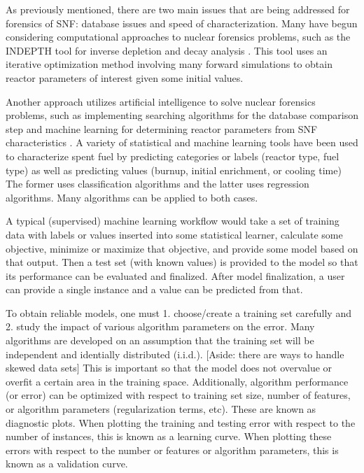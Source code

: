 As previously mentioned, there are two main issues that are being addressed for
forensics of \gls{SNF}: database issues and speed of characterization. Many
have begun considering computational approaches to nuclear forensics problems,
such as the INDEPTH tool for inverse depletion and decay analysis
\cite{weber_2006, weber_2010, weber_2011}. This tool uses an iterative
optimization method involving many forward simulations to obtain reactor
parameters of interest given some initial values. 

Another approach utilizes artificial intelligence to solve nuclear forensics
problems, such as implementing searching algorithms for the database comparison
step \cite{gey_search} and machine learning for determining reactor parameters
from \gls{SNF} characteristics \cite{dayman_feasibility_2013, nicolaou_2006,
nicolaou_2009, nicolaou_2014, robel_2009, jones_viz_2014, jones_snf_2014}.  A
variety of statistical and machine learning tools have been used to
characterize spent fuel by predicting categories or labels (reactor type, fuel
type) as well as predicting values (burnup, initial enrichment, or cooling
time) The former uses classification algorithms and the latter uses regression
algorithms. Many algorithms can be applied to both cases.

A typical (supervised) machine learning workflow would take a set of training
data with labels or values inserted into some statistical learner, calculate
some objective, minimize or maximize that objective, and provide some model
based on that output. Then a test set (with known values) is provided to the
model so that its performance can be evaluated and finalized. After model
finalization, a user can provide a single instance and a value can be predicted
from that. 

To obtain reliable models, one must 1. choose/create a training set carefully
and 2. study the impact of various algorithm parameters on the error. Many
algorithms are developed on an assumption that the training set will be
independent and identially distributed (i.i.d.). [Aside: there are ways to
handle skewed data sets] This is important so that the model does not overvalue
or overfit a certain area in the training space. Additionally, algorithm
performance (or error) can be optimized with respect to training set size,
number of features, or algorithm parameters (regularization terms, etc).  These
are known as diagnostic plots. When plotting the training and testing error
with respect to the number of instances, this is known as a learning curve.
When plotting these errors with respect to the number or features or algorithm
parameters, this is known as a validation curve. 

